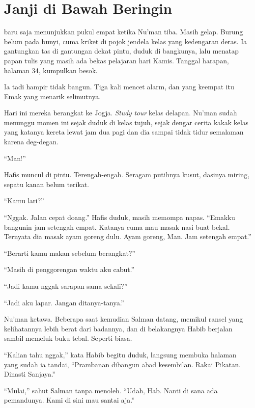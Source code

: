 \chapter*{Janji di Bawah Beringin}


 baru saja menunjukkan pukul empat ketika Nu'man tiba. Masih gelap. Burung belum pada bunyi, cuma kriket di pojok jendela kelas yang kedengaran deras. Ia gantungkan tas di gantungan dekat pintu, duduk di bangkunya, lalu menatap papan tulis yang masih ada bekas pelajaran hari Kamis. Tanggal harapan, halaman 34, kumpulkan besok.

Ia tadi hampir tidak bangun. Tiga kali mencet alarm, dan yang keempat itu Emak yang menarik selimutnya.

Hari ini mereka berangkat ke Jogja. \textit{Study tour} kelas delapan. Nu'man sudah menunggu momen ini sejak duduk di kelas tujuh, sejak dengar cerita kakak kelas yang katanya kereta lewat jam dua pagi dan dia sampai tidak tidur semalaman karena deg-degan.

``Man!''

Hafis muncul di pintu. Terengah-engah. Seragam putihnya kusut, dasinya miring, sepatu kanan belum terikat.

``Kamu lari?''

``Nggak. Jalan cepat doang.'' Hafis duduk, masih memompa napas. ``Emakku bangunin jam setengah empat. Katanya cuma mau masak nasi buat bekal. Ternyata dia masak ayam goreng dulu. Ayam goreng, Man. Jam setengah empat.''

``Berarti kamu makan sebelum berangkat?''

``Masih di penggorengan waktu aku cabut.''

``Jadi kamu nggak sarapan sama sekali?''

``Jadi aku lapar. Jangan ditanya-tanya.''

Nu'man ketawa. Beberapa saat kemudian Salman datang, memikul ransel yang kelihatannya lebih berat dari badannya, dan di belakangnya Habib berjalan sambil memeluk buku tebal. Seperti biasa.

``Kalian tahu nggak,'' kata Habib begitu duduk, langsung membuka halaman yang sudah ia tandai, ``Prambanan dibangun abad kesembilan. Rakai Pikatan. Dinasti Sanjaya.''

``Mulai,'' sahut Salman tanpa menoleh. ``Udah, Hab. Nanti di sana ada pemandunya. Kami di sini mau santai aja.''

